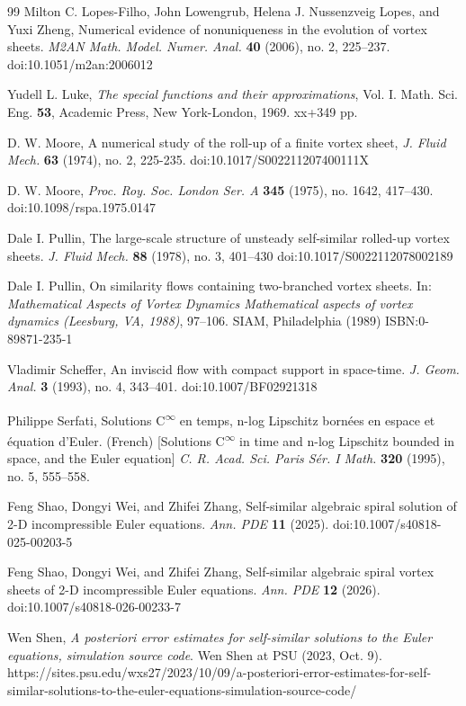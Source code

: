 \documentclass[11pt]{article}
\theoremstyle{definition}
\theoremstyle{remark}
\numberwithin{equation}{section}
\newcommand{\tbf}{\textbf}
\newcommand{\tsup}{\textsuperscript}
\begin{document}
\begin{flushleft}
\begin{thebibliography}{99}
 Milton C. Lopes-Filho, John Lowengrub, Helena J. Nussenzveig Lopes, and Yuxi Zheng, Numerical evidence of nonuniqueness in the evolution of vortex sheets. \textit{M2AN Math. Model. Numer. Anal.} \tbf{40} (2006), no. 2, 225–237. doi:10.1051/m2an:2006012

 Yudell L. Luke, \textit{The special functions and their approximations}, Vol. I.
Math. Sci. Eng. \tbf{53}, Academic Press, New York-London, 1969. xx+349 pp.

 D. W. Moore, A numerical study of the roll-up of a finite vortex sheet, \textit{J. Fluid Mech.} \tbf{63} (1974), no. 2, 225-235. doi:10.1017/S002211207400111X

 D. W. Moore, \textit{Proc. Roy. Soc. London Ser. A} \tbf{345} (1975), no. 1642, 417–430. doi:10.1098/rspa.1975.0147

 Dale I. Pullin, The large-scale structure of unsteady self-similar rolled-up vortex sheets. \textit{J. Fluid Mech.} \tbf{88} (1978), no. 3, 401–430 doi:10.1017/S0022112078002189

 Dale I. Pullin, On similarity flows containing two-branched vortex sheets. In: \textit{Mathematical Aspects of Vortex Dynamics Mathematical aspects of vortex dynamics (Leesburg, VA, 1988)}, 97–106. SIAM, Philadelphia (1989) ISBN:0-89871-235-1

 Vladimir Scheffer, An inviscid flow with compact support in space-time. \textit{J. Geom. Anal.} \tbf{3} (1993), no. 4, 343–401. doi:10.1007/BF02921318

 Philippe Serfati, Solutions C\tsup{$\infty$} en temps, n-log Lipschitz bornées en espace et équation d'Euler. (French) [Solutions C\tsup{$\infty$} in time and n-log Lipschitz bounded in space, and the Euler equation] \textit{C. R. Acad. Sci. Paris Sér. I Math.} \tbf{320} (1995), no. 5, 555–558.

 Feng Shao, Dongyi Wei, and Zhifei Zhang, Self-similar algebraic spiral solution of 2-D incompressible Euler equations. \textit{Ann. PDE} \tbf{11} (2025). doi:10.1007/s40818-025-00203-5

 Feng Shao, Dongyi Wei, and Zhifei Zhang, Self-similar algebraic spiral vortex sheets of 2-D incompressible Euler equations. \textit{Ann. PDE} \tbf{12} (2026). doi:10.1007/s40818-026-00233-7

 Wen Shen, \textit{A posteriori error estimates for self-similar solutions to the Euler equations, simulation source code}. Wen Shen at PSU (2023, Oct. 9). https://sites.psu.edu/wxs27/2023/10/09/a-posteriori-error-estimates-for-self-similar-solutions-to-the-euler-equations-simulation-source-code/


\end{thebibliography}
\end{flushleft}
\end{document}
